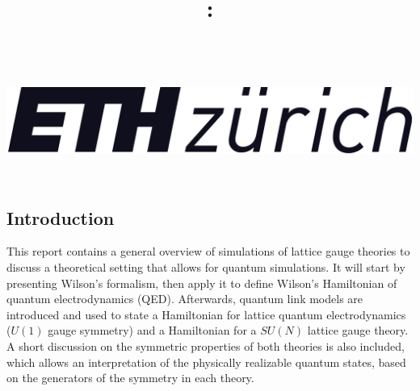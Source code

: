 \documentclass[a4paper]{report}
\title{\vspace{1in}\textmd{\textbf{\hmwkClass: \\ \hmwkTitle\ifthenelse{\equal{\hmwkSubTitle}{}}{}{\\\hmwkSubTitle}}}\\\normalsize\vspace{0.1in}\small{\hmwkDueDate}\\\vspace{0.5in}\includegraphics[width=0.4\linewidth]{logo.png}\\\large{\textit{ \hmwkClassTime}}\vspace{2in}}
\date{}
\author{\textbf{\hmwkAuthorNameI}}%
\begin{document}
\begin{spacing}{1.1}


\maketitle


\setcounter{tocdepth}{2}
\tableofcontents
\newpage









\section{Introduction} 

This report contains a general overview of simulations of lattice gauge theories to discuss a theoretical setting that allows for quantum simulations. It will start by presenting Wilson's formalism, then apply it to define Wilson's Hamiltonian of quantum electrodynamics (QED). Afterwards, quantum link models are introduced and used to state a Hamiltonian for lattice quantum electrodynamics ($U(1)$ gauge symmetry) and a Hamiltonian for a $SU(N)$ lattice gauge theory. A short discussion on the symmetric properties of both theories is also included, which allows an interpretation of the physically realizable quantum states, based on the generators of the symmetry in each theory.




\end{spacing}
\end{document}

